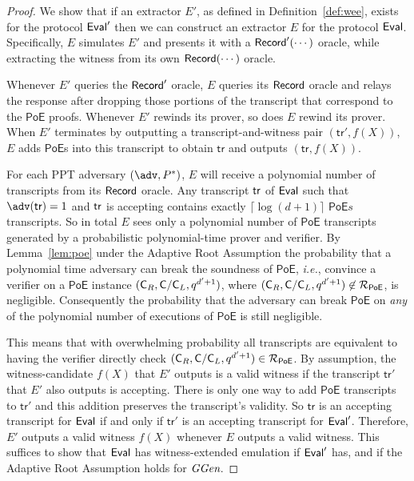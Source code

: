 \documentclass{article}
\theoremstyle{definition}
\begin{document}
\begin{proof}
We show that if an extractor $E'$, as defined in Definition~\ref{def:wee}, exists for the protocol $\textsf{{Eval}}'$ then we can construct an extractor $E$ for the protocol $\textsf{{Eval}}$. Specifically, $E$ simulates $E'$ and presents it with a $\textsf{{Record}}'(\cdots)$ oracle, while extracting the witness from its own $\textsf{{Record}}(\cdots)$ oracle.

Whenever $E'$ queries the $\textsf{{Record}}'$ oracle, $E$ queries its $\textsf{{Record}}$ oracle and relays the response after dropping those portions of the transcript that correspond to the $\mathsf{PoE}$ proofs. Whenever $E'$ rewinds its prover, so does $E$ rewind its prover. When $E'$ terminates by outputting a transcript-and-witness pair $(\mathsf{tr}', f(X))$, $E$ adds $\mathsf{PoE}$s into this transcript to obtain $\mathsf{tr}$ and outputs $(\mathsf{tr}, f(X))$.

For each PPT adversary $(\adv,P^*)$, $E$ will receive a polynomial number of transcripts from its $\textsf{{Record}}$ oracle. Any transcript $\textsf{{tr}}$ of $\textsf{{Eval}}$ such that $\adv(\tr)=1$ and $\textsf{{tr}}$ is accepting contains exactly $\lceil \log(d+1)\rceil$ $\textsf{PoE}s$ transcripts. 
So in total $E$ sees only a polynomial number of $\textsf{PoE}$ transcripts generated by a probabilistic polynomial-time prover and verifier. By Lemma~\ref{lem:poe} under the Adaptive Root Assumption the probability that a polynomial time adversary can break the soundness of $\textsf{PoE}$, \emph{i.e.}, convince a verifier on a $\textsf{PoE}$ instance $(\mathsf{C}_R,\mathsf{C}/\mathsf{C}_{L},q^{d'+1})$, where $(\mathsf{C}_R,\mathsf{C}/\mathsf{C}_{L},q^{d'+1})\not\in\mathcal{R}_{\textsf{PoE}}$, is negligible. 
Consequently the probability that the adversary can break $\textsf{PoE}$ on \emph{any} of the polynomial number of executions of $\mathsf{PoE}$ is still negligible.

This means that with overwhelming probability all transcripts are equivalent to having the verifier directly check $(\mathsf{C}_R,\mathsf{C}/\mathsf{C}_{L},q^{d'+1})\in\mathcal{R}_{\textsf{PoE}}$. By assumption, the witness-candidate $f(X)$ that $E'$ outputs is a valid witness if the transcript $\mathsf{tr}'$ that $E'$ also outputs is accepting. There is only one way to add $\mathsf{PoE}$ transcripts to $\mathsf{tr}'$ and this addition preserves the transcript's validity. So $\mathsf{tr}$ is an accepting transcript for $\textsf{{Eval}}$ if and only if $\mathsf{tr}'$ is an accepting transcript for $\textsf{{Eval}}'$. Therefore, $E'$ outputs a valid witness $f(X)$ whenever $E$ outputs a valid witness. This suffices to show that $\textsf{{Eval}}$ has witness-extended emulation if $\textsf{{Eval}}'$ has, and if the Adaptive Root Assumption holds for $\textit{GGen}$.
\end{proof}
\end{document}

